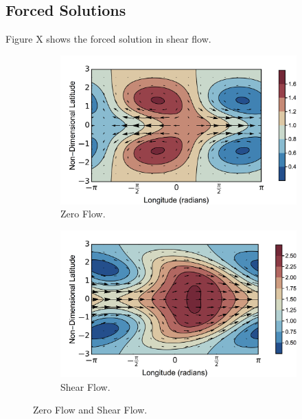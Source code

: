 \subsection{Forced Solutions}

Figure X shows the forced solution in shear flow.


\begin{figure}
  \begin{subfigure}[b]{0.4\textwidth}
    \includegraphics[width=\textwidth]{figures/wave-mean-flow/ps-no-flow.png}
    \caption{Zero Flow.}
    \label{fig:ps-no-flow}
  \end{subfigure}
  \begin{subfigure}[b]{0.4\textwidth}
    \includegraphics[width=\textwidth]{figures/wave-mean-flow/ps-shear-flow.png}
    \caption{Shear Flow.}
    \label{fig:ps-shear-flow}
  \end{subfigure}
  \caption{Zero Flow and Shear Flow.}
  \label{fig:ps-flow}
\end{figure}


